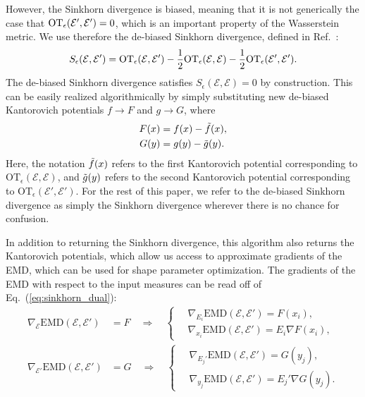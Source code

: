 \documentclass[letterpaper,11pt]{article}
\newcommand{\E}{\mathcal{E}}
\newcommand{\EMD}{\text{EMD}}
\DeclareRobustCommand{\Eq}[1]{Eq.~(\ref{eq:#1})}
\DeclareRobustCommand{\Refer}[1]{Ref.~\cite{#1}}
\begin{document}
However, the Sinkhorn divergence is biased, meaning that it is not generically the case that ${\rm OT}_\epsilon(\E', \E') = 0$, which is an important property of the Wasserstein metric. We use therefore the de-biased Sinkhorn divergence, defined in \Refer{feydy2019interpolating}:
\begin{align}
    S_{\epsilon}(\E, \E') = {\rm OT}_\epsilon(\E, \E') - \frac{1}{2}{\rm OT}_\epsilon(\E, \E) - \frac{1}{2}{\rm OT}_\epsilon(\E', \E').
\end{align}
The de-biased Sinkhorn divergence satisfies $S_{\epsilon}(\E,\E) = 0$ by construction. This can be easily realized algorithmically by simply substituting new de-biased Kantorovich potentials $f \to F$ and $g \to G$, where
%
\begin{align}
    F(x) &= f(x) - \Tilde{f}(x), \\
    G(y) &= g(y) - \Tilde{g}(y).
\end{align}
%
Here, the notation $\Tilde{f}(x)$ refers to the first Kantorovich potential corresponding to $\text{OT}_{\epsilon}(\E,\E)$, and $\Tilde{g}(y)$ refers to the second Kantorovich potential corresponding to $\text{OT}_{\epsilon}(\E',\E')$. For the rest of this paper, we refer to the de-biased Sinkhorn divergence as simply the Sinkhorn divergence wherever there is no chance for confusion.

In addition to returning the Sinkhorn divergence, this algorithm also returns the Kantorovich potentials, which allow us access to approximate gradients of the EMD, which can be used for shape parameter optimization. The gradients of the EMD with respect to the input measures can be read off of \Eq{sinkhorn_dual}:
\begin{align}
    \nabla_{\E} \EMD(\E, \E') &= F \quad\Rightarrow{}\quad \begin{cases}
        \quad\nabla_{E_i} \EMD(\E, \E') = F(x_i),\\
       \quad\nabla_{x_i} \EMD(\E, \E') = E_i \nabla F(x_i),
    \end{cases} \nonumber\\
    \nabla_{\E'} \EMD(\E, \E') &= G \quad\Rightarrow{}\quad  \begin{cases}
        \quad\nabla_{E_j'} \EMD(\E, \E') = G(y_j),\\
       \quad\nabla_{y_j} \EMD(\E, \E') = E_j' \nabla G(y_j).
    \end{cases}
    \label{eq:emd_grads_2}
\end{align}
%
\end{document}
